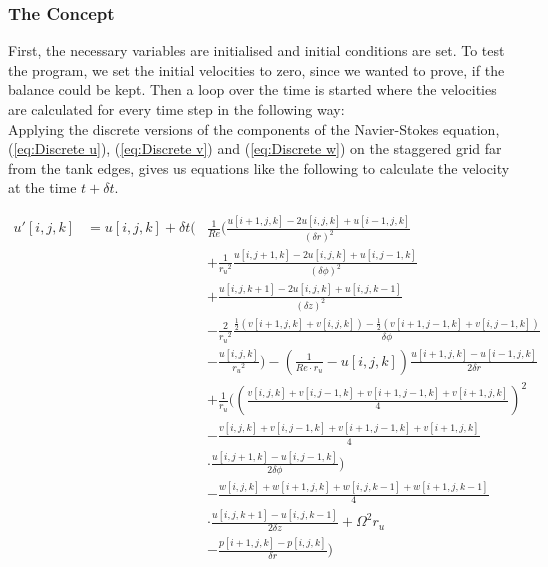 \documentclass[12pt, a4paper]{article} %
\begin{document}
		\subsubsection{The Concept}
			
			First, the necessary variables are initialised and initial conditions are set. To test the program, we set the initial velocities to zero, since we wanted to prove, if the balance could be kept.
			Then a loop over the time is started where the velocities are calculated for every time step in the following way:\\
			
			Applying the discrete versions of the components of the Navier-Stokes equation, (\ref{eq:Discrete u}), (\ref{eq:Discrete v}) and (\ref{eq:Discrete w}) on the staggered grid far from the tank edges, gives us equations like the following to calculate the velocity at the time $t + \delta t$.
			
			{\allowdisplaybreaks
			\begin{eqnarray}
				u'[i,j,k] &= u[i,j,k] + \delta t \Bigg(& \frac{1}{Re}\Bigg(\frac{u[i+1,j,k]-2u[i,j,k]+u[i-1,j,k]}{(\delta r)^2}
				\nonumber \\
				&& + \frac{1}{{r_u}^2}\frac{u[i,j+1,k]-2u[i,j,k]+u[i,j-1,k]}{(\delta \phi)^2}
				\nonumber \\
				&& + \frac{u[i,j,k+1] - 2u[i,j,k] +u[i,j,k-1]}{(\delta z)^2}
				\nonumber \\
				&& - \frac{2}{{r_u}^2}\frac{\frac{1}{2}\left(v[i+1,j,k]+v[i,j,k]\right)-\frac{1}{2}\left(v[i+1,j-1,k]+v[i,j-1,k]\right)}{\delta \phi}
				\nonumber \\
				&& - \frac{u[i,j,k]}{{r_u}^2}\Bigg) - \left(\frac{1}{Re\cdot r_u} - u[i,j,k]\right)\frac{u[i+1,j,k]-u[i-1,j,k]}{2\delta r}
				\nonumber \\
				&& + \frac{1}{r_u}\Bigg(\left(\frac{v[i,j,k]+v[i,j-1,k]+v[i+1,j-1,k]+v[i+1,j,k]}{4}\right)^2
				\nonumber \\
				&& - \frac{v[i,j,k]+v[i,j-1,k]+v[i+1,j-1,k]+v[i+1,j,k]}{4}
				\nonumber \\
				&&\cdot \frac{u[i,j+1,k]-u[i,j-1,k]}{2\delta \phi}\Bigg)
				\nonumber \\
				&& - \frac{w[i,j,k]+w[i+1,j,k]+w[i,j,k-1]+w[i+1,j,k-1]}{4}
				\nonumber \\
				&&\cdot \frac{u[i,j,k+1]-u[i,j,k-1]}{2\delta z} + \Omega^2 r_u
				\nonumber \\
				&& - \frac{p[i+1,j,k]-p[i,j,k]}{\delta r} \Bigg)
			\end{eqnarray}
			}
			
\end{document}
